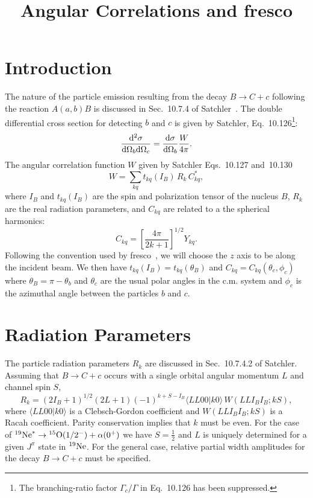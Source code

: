 \documentclass[aps,prc,amsfonts,nofootinbib]{revtex4}
\begin{document}
\title{ Angular Correlations and {\sc fresco}}
\maketitle

\section{Introduction}

The nature of the particle emission resulting from the decay
$B\rightarrow C+c$ following the reaction $A(a,b)B$ is discussed
in Sec.~10.7.4 of Satchler~\cite{Sat83}.
The double differential cross section for detecting $b$ and $c$
is given by Satchler,
Eq.~10.126\footnote{The branching-ratio factor $\Gamma_c/\Gamma$
in Eq.~10.126 has been suppressed.}:
\begin{equation}
\frac{{\rm d}^2 \sigma}{{\rm d}\Omega_b{\rm d}\Omega_c} =
\frac{{\rm d}\sigma}{{\rm d}\Omega_b} \frac{W}{4\pi} .
\end{equation}
The angular correlation function $W$ given by Satchler Eqs.~10.127 and~10.130
\begin{equation}
W=\sum_{kq} t_{kq}(I_B) \, R_k \, C_{kq}^* ,
\end{equation}
where $I_B$ and $t_{kq}(I_B)$ are the spin and polarization tensor of
the nucleus $B$, $R_k$ are the real radiation parameters,
and $C_{kq}$ are related to a the spherical harmonics:
\begin{equation}
C_{kq}=\left [ \frac{4\pi}{2k+1} \right]^{1/2} Y_{kq}.
\end{equation}
Following the convention used by {\sc fresco}~\cite{Tho88}, we will
choose the $z$ axis to be along the incident beam.
We then have  $t_{kq}(I_B)=t_{kq}(\theta_B)$ and
$C_{kq}=C_{kq}(\theta_c,\phi_c)$ where $\theta_B=\pi-\theta_b$ and
$\theta_c$ are the usual polar angles in the c.m. system and $\phi_c$ is
the azimuthal angle between the particles $b$ and $c$.

\section{Radiation Parameters}

The particle radiation parameters $R_k$ are discussed in Sec.~10.7.4.2
of Satchler.
Assuming that $B\rightarrow C+c$ occurs with a single orbital
angular momentum $L$ and channel spin $S$,
\begin{equation}
R_k=(2I_B+1)^{1/2}(2L+1)(-1)^{k+S-I_B}\langle LL00|k0\rangle \,
W(LLI_BI_B;kS),
\end{equation}
where $\langle LL00|k0\rangle$ is a Clebsch-Gordon coefficient
and $W(LLI_BI_B;kS)$ is a Racah coefficient.
Parity conservation implies that $k$ must be even.
For the case of ${}^{19}{\rm Ne}^*\rightarrow
{}^{15}{\rm O}(1/2^-)+\alpha(0^+)$
we have $S=\frac{1}{2}$ and $L$ is uniquely determined for
a given $J^\pi$ state in ${}^{19}{\rm Ne}$.
For the general case, relative partial width amplitudes for the decay
$B\rightarrow C+c$ must be specified.
\end{document}
